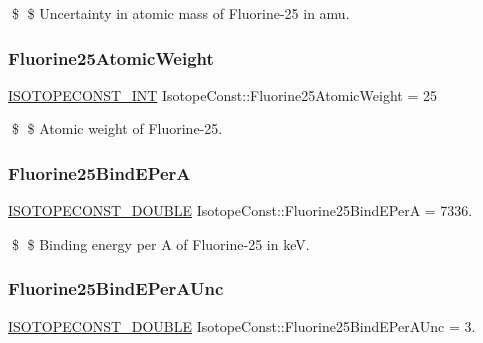 \$ \$ Uncertainty in atomic mass of Fluorine-\/25 in amu. \mbox{\label{group___isotope_const-_fluorine-_f25_ga1a8ed7f69072a969fb33f5abf00df071}} 
\subsubsection{\texorpdfstring{Fluorine25\+Atomic\+Weight}{Fluorine25AtomicWeight}}
{\footnotesize\ttfamily \mbox{\hyperlink{group___isotope_const-_macros_ga5f18360b3e99483a35c32d789e62621c}{I\+S\+O\+T\+O\+P\+E\+C\+O\+N\+S\+T\+\_\+\+I\+NT}} Isotope\+Const\+::\+Fluorine25\+Atomic\+Weight = 25}

\$ \$ Atomic weight of Fluorine-\/25. \mbox{\label{group___isotope_const-_fluorine-_f25_ga9e0e9d0c0af73148072e5ddc10d3d798}} 
\subsubsection{\texorpdfstring{Fluorine25\+Bind\+E\+PerA}{Fluorine25BindEPerA}}
{\footnotesize\ttfamily \mbox{\hyperlink{group___isotope_const-_macros_ga8f45a7272ce02c0b4c65c44636ed719a}{I\+S\+O\+T\+O\+P\+E\+C\+O\+N\+S\+T\+\_\+\+D\+O\+U\+B\+LE}} Isotope\+Const\+::\+Fluorine25\+Bind\+E\+PerA = 7336.}

\$ \$ Binding energy per A of Fluorine-\/25 in keV. \mbox{\label{group___isotope_const-_fluorine-_f25_gaec76d3031def6f713a525c73f1d3dd8a}} 
\subsubsection{\texorpdfstring{Fluorine25\+Bind\+E\+Per\+A\+Unc}{Fluorine25BindEPerAUnc}}
{\footnotesize\ttfamily \mbox{\hyperlink{group___isotope_const-_macros_ga8f45a7272ce02c0b4c65c44636ed719a}{I\+S\+O\+T\+O\+P\+E\+C\+O\+N\+S\+T\+\_\+\+D\+O\+U\+B\+LE}} Isotope\+Const\+::\+Fluorine25\+Bind\+E\+Per\+A\+Unc = 3.}


